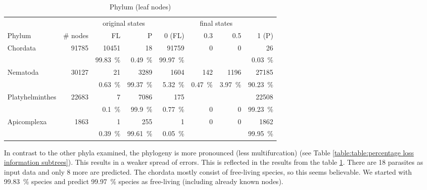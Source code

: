       \begin{table}[h]
        \begin{center}
          \begin{tabular}{ |l|r||r|r||r|r|r|r| }
            \hline
            & & \multicolumn{2}{c||}{original states} & \multicolumn{4}{c|}{final states} \\
            Phylum & \# nodes       & FL & P              & 0 (FL) & 0.3 & 0.5 & 1 (P) \\
            \hline \hline
            Chordata & 91785        & 10451 & 18          & 91759 & 0 & 0 & 26 \\
            &                       & 99.83~\% & 0.49~\%  & 99.97~\% & & & 0.03~\% \\ \hline
            Nematoda & 30127        & 21 & 3289           & 1604 & 142 & 1196 & 27185 \\
            &                       & 0.63~\% & 99.37~\%  & 5.32~\% & 0.47~\% & 3.97~\% & 90.23~\% \\ \hline
            Platyhelminthes & 22683 & 7 & 7086            & 175 & & & 22508 \\
            &                       & 0.1~\% & 99.9~\%    & 0.77~\% & 0 & 0 & 99.23~\% \\ \hline
            Apicomplexa & 1863      & 1 & 255             & 1 & 0 & 0 & 1862 \\
            &                       & 0.39~\% & 99.61~\%  & 0.05~\% & & & 99.95~\% \\
            \hline
          \end{tabular} 
        \end{center}
        \caption{Phylum (leaf nodes)}
        \label{table:phylum leaf nodes states} 
      \end{table}

      In contrast to the other phyla examined, the phylogeny is more pronounced (less multifurcation) (see 
        Table \ref{table:table:percentage loss information subtrees}). This results in a weaker spread of 
        errors. This is reflected in the results from the table \ref{table:phylum leaf nodes states}. 
        There are 18 parasites as input data and only 8 more are predicted. The chordata mostly consist of 
        free-living species, so this seems believable. We started with 99.83~\%  species and 
        predict 99.97~\% species as free-living (including already known nodes). 

